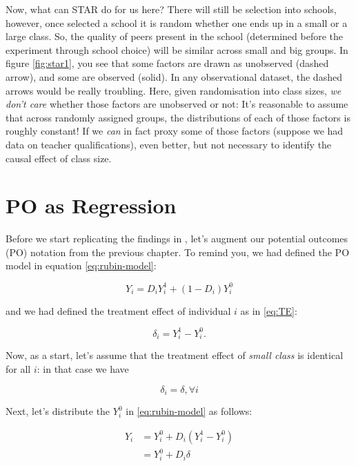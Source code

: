 \documentclass[]{book}
\begin{document}
Now, what can STAR do for us here? There will still be selection into
schools, however, once selected a school it is random whether one ends
up in a small or a large class. So, the quality of peers present in the
school (determined before the experiment through school choice) will be
similar across small and big groups. In figure \ref{fig:star1}, you see
that some factors are drawn as unobserved (dashed arrow), and some are
observed (solid). In any observational dataset, the dashed arrows would
be really troubling. Here, given randomisation into class sizes,
\emph{we don't care} whether those factors are unobserved or not: It's
reasonable to assume that across randomly assigned groups, the
distributions of each of those factors is roughly constant! If we
\emph{can} in fact proxy some of those factors (suppose we had data on
teacher qualifications), even better, but not necessary to identify the
causal effect of class size.

\section{PO as Regression}\label{po-as-regression}

Before we start replicating the findings in \citet{krueger1999}, let's
augment our potential outcomes (PO) notation from the previous chapter.
To remind you, we had defined the PO model in equation
\eqref{eq:rubin-model}:

\begin{equation*}
Y_i = D_i Y_i^1 + (1-D_i)Y_i^0 
\end{equation*}

and we had defined the treatment effect of individual \(i\) as in
\eqref{eq:TE}:

\begin{equation*}
\delta_i = Y_i^1 - Y_i^0. 
\end{equation*}

Now, as a start, let's assume that the treatment effect of \emph{small
class} is identical for all \(i\): in that case we have

\begin{equation*}
\delta_i = \delta ,\forall i
\end{equation*}

Next, let's distribute the \(Y_i^0\) in \eqref{eq:rubin-model} as follows:

\begin{align*}
Y_i &= Y_i^0 + D_i (Y_i^1 - Y_i^0 )\\
    &= Y_i^0 + D_i \delta  
\end{align*}
\end{document}
